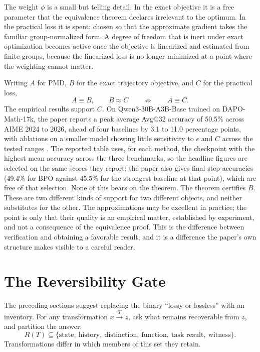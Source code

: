 \documentclass[11pt]{article}
\theoremstyle{remark}
\begin{document}
The weight $\phi$ is a small but telling detail. In the exact objective it is a free parameter that the equivalence theorem declares irrelevant to the optimum. In the practical loss it is spent: chosen so that the approximate gradient takes the familiar group-normalized form. A degree of freedom that is inert under exact optimization becomes active once the objective is linearized and estimated from finite groups, because the linearized loss is no longer minimized at a point where the weighting cannot matter.

Writing $A$ for PMD, $B$ for the exact trajectory objective, and $C$ for the practical loss,
\[
A\equiv B,\qquad B\approx C\qquad\not\Rightarrow\qquad A\equiv C.
\]
The empirical results support $C$. On Qwen3-30B-A3B-Base trained on DAPO-Math-17k, the paper reports a peak average Avg@32 accuracy of 50.5\% across AIME 2024 to 2026, ahead of four baselines by 3.1 to 11.0 percentage points, with ablations on a smaller model showing little sensitivity to $\epsilon$ and $C$ across the tested ranges \cite{bpo}. The reported table uses, for each method, the checkpoint with the highest mean accuracy across the three benchmarks, so the headline figures are selected on the same scores they report; the paper also gives final-step accuracies (49.4\% for BPO against 45.5\% for the strongest baseline at that point), which are free of that selection. None of this bears on the theorem. The theorem certifies $B$. These are two different kinds of support for two different objects, and neither substitutes for the other. The approximations may be excellent in practice; the point is only that their quality is an empirical matter, established by experiment, and not a consequence of the equivalence proof. This is the difference between verification and obtaining a favorable result, and it is a difference the paper's own structure makes visible to a careful reader.

\section{The Reversibility Gate}

The preceding sections suggest replacing the binary ``lossy or lossless'' with an inventory. For any transformation $x\xrightarrow{T}z$, ask what remains recoverable from $z$, and partition the answer:
\[
R(T)\subseteq\{\text{state},\ \text{history},\ \text{distinction},\ \text{function},\ \text{task result},\ \text{witness}\}.
\]
Transformations differ in which members of this set they retain.
\end{document}
